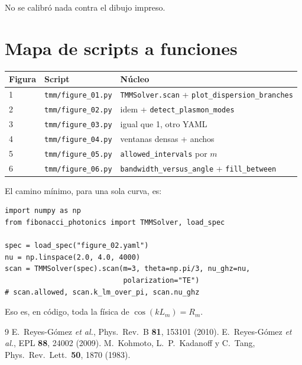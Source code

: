 \documentclass[11pt,a4paper]{article}
\begin{document}
No se calibró nada contra el dibujo impreso.

\section{Mapa de scripts a funciones}

\begin{center}
\begin{tabular}{lll}
\toprule
Figura & Script & Núcleo \\
\midrule
1 & \texttt{tmm/figure\_01.py} & \texttt{TMMSolver.scan} + \texttt{plot\_dispersion\_branches} \\
2 & \texttt{tmm/figure\_02.py} & idem + \texttt{detect\_plasmon\_modes} \\
3 & \texttt{tmm/figure\_03.py} & igual que 1, otro YAML \\
4 & \texttt{tmm/figure\_04.py} & ventanas densas + anchos \\
5 & \texttt{tmm/figure\_05.py} & \texttt{allowed\_intervals} por \(m\) \\
6 & \texttt{tmm/figure\_06.py} & \texttt{bandwidth\_versus\_angle} + \texttt{fill\_between} \\
\bottomrule
\end{tabular}
\end{center}

El camino mínimo, para una sola curva, es:

\begin{lstlisting}[style=tiny]
import numpy as np
from fibonacci_photonics import TMMSolver, load_spec

spec = load_spec("figure_02.yaml")
nu = np.linspace(2.0, 4.0, 4000)
scan = TMMSolver(spec).scan(m=3, theta=np.pi/3, nu_ghz=nu,
                            polarization="TE")
# scan.allowed, scan.k_lm_over_pi, scan.nu_ghz
\end{lstlisting}

Eso es, en código, toda la física de \(\cos(k L_m)=R_m\).

\begin{thebibliography}{9}
E.~Reyes-Gómez \textit{et al.}, Phys.\ Rev.\ B \textbf{81}, 153101 (2010).
E.~Reyes-Gómez \textit{et al.}, EPL \textbf{88}, 24002 (2009).
M.~Kohmoto, L.~P.~Kadanoff y C.~Tang, Phys.\ Rev.\ Lett.\ \textbf{50}, 1870 (1983).
\end{thebibliography}
\end{document}

